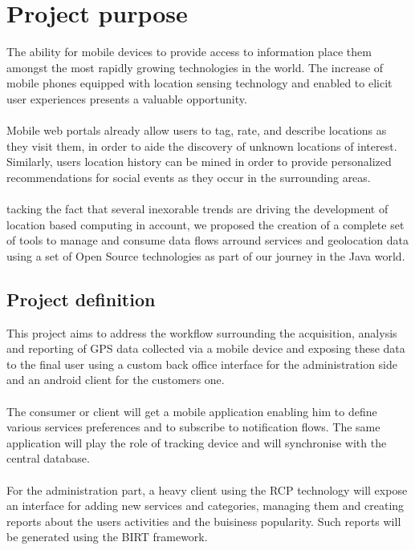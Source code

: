
\section{Project purpose}
The ability for mobile devices to provide access to information place them
amongst the most rapidly growing technologies in the world. The increase of
mobile phones equipped with location sensing technology and enabled to elicit
user experiences presents a valuable opportunity.
\\
\\
Mobile web portals already allow users to tag, rate, and describe locations as
they visit them, in order to aide the discovery of unknown locations of interest.
Similarly, users location history can be mined in order to provide personalized
recommendations for social events as they occur in the surrounding areas.
\\
\\
tacking the fact that several inexorable trends are driving the development of
location based computing in account, we proposed the creation of a complete set
of tools to manage and consume data flows arround services and geolocation data
using a set of Open Source technologies as part of our journey in the Java world.

\subsection{Project definition}
This project aims to address the workflow surrounding the acquisition, analysis
and reporting of GPS data collected via a mobile device and exposing these data
to the final user using a custom back office interface for the administration
side and an android client for the customers one.
\\
\\
The consumer or client will get a mobile application enabling him to define
various services preferences and to subscribe to notification flows. The same
application will play the role of tracking device and will synchronise with the
central database.
\\
\\
For the administration part, a heavy client using the RCP technology will expose
an interface for adding new services and categories, managing them and creating
reports about the users activities and the buisiness popularity. Such reports
will be generated using the BIRT framework.

